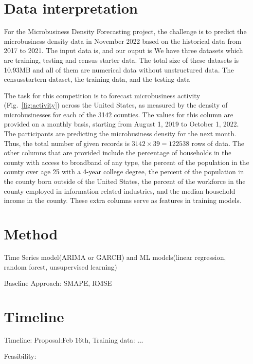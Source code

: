 \documentclass[prl,aps,superscriptaddress,twocolumn,11pt,nolongbibliography]{revtex4-2}
\begin{document}
\section{Data interpretation}
For the Microbusiness Density Forecasting project, the challenge is to predict the microbusiness density data in November 2022 based on the historical data from 2017 to 2021. The input data is, and our ouput is 
We have three datasets which are training, testing and census starter data. The total size of these datasets is 10.93MB and all of them are numerical data without unstructured data. The censusstartern dataset, the training data, and the testing data

The task for this competition is to forecast microbusiness activity (Fig.~\ref{fig:activity}) across the United States, as measured by the density of microbusinesses for each of the 3142 counties. 
The values for this column are provided on a monthly basis, starting from August 1, 2019 to October 1, 2022. 
The participants are predicting the microbusiness density for the next month. 
Thus, the total number of given records is $3142 \times 39 = 122538$ rows of data.
The other columns that are provided include the percentage of households in the county with access to broadband of any type, the percent of the population in the county over age 25 with a 4-year college degree, the percent of the population in the county born outside of the United States, the percent of the workforce in the county employed in information related industries, and the median household income in the county. 
These extra columns serve as features in training models.


\section{Method}
Time Series model(ARIMA or GARCH) and ML models(linear regression, random forest, unsupervised learning)

Baseline Approach: SMAPE, RMSE

\section{Timeline}
Timeline: Proposal:Feb 16th, Training data: ...

Feasibility: 
\end{document}
